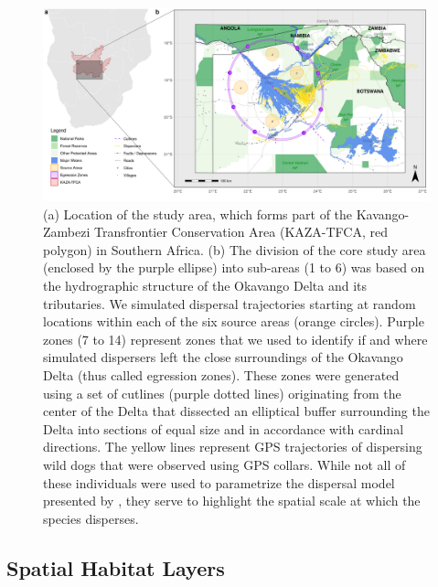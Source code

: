 \documentclass[../FinalThesis.tex]{subfiles}
\begin{document}
\begin{figure}[htpb]
 \begin{center}
  \includegraphics[width = \textwidth]{Figures/StudyArea2.png}
  \caption{(a) Location of the study area, which forms part of the
  Kavango-Zambezi Transfrontier Conservation Area (KAZA-TFCA, red polygon) in
  Southern Africa. (b) The division of the core study area (enclosed by the
  purple ellipse) into sub-areas (1 to 6) was based on the hydrographic
  structure of the Okavango Delta and its tributaries. We simulated dispersal
  trajectories starting at random locations within each of the six source areas
  (orange circles). Purple zones (7 to 14) represent zones that we used to
  identify if and where simulated dispersers left the close surroundings of the
  Okavango Delta (thus called egression zones). These zones were generated using
  a set of cutlines (purple dotted lines) originating from the center of the
  Delta that dissected an elliptical buffer surrounding the Delta into sections
  of equal size and in accordance with cardinal directions. The yellow lines
  represent GPS trajectories of dispersing wild dogs that were observed using
  GPS collars. While not all of these individuals were used to parametrize the
  dispersal model presented by \citet{Hofmann.2023}, they serve to highlight the
  spatial scale at which the species disperses.}
  \label{StudyAreaCH2}
 \end{center}
\end{figure}

\subsection{Spatial Habitat Layers}
\end{document}
